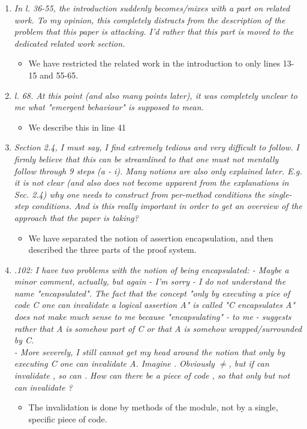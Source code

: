 \documentclass[11pt]{amsart}
\begin{document}
\begin{enumerate}
\item
\emph{In l. 36-55, the introduction suddenly becomes/mixes with a part on related work. To my opinion, this completely distracts from the description of the problem that this paper is attacking. I'd rather that this part is moved to the dedicated related work section.}

\begin{itemize}
\item We have restricted the related work in the introduction to only lines 13-15 and 55-65.
\end{itemize}
\item
\emph{l. 68. At this point (and also many points later), it was completely unclear to me what "emergent behaviour" is supposed to mean. }

\begin{itemize}
\item We describe this in line 41
\end{itemize}
\item
\emph{
Section 2.4, I must say, I find extremely tedious and very difficult to follow. I firmly believe that this can be streamlined to that one must not mentally follow through 9 steps (a - i). Many notions are also only explained later. E.g. it is not clear (and also does not become apparent from the explanations in Sec. 2.4) why one needs to construct from per-method conditions the single-step conditions. And is this really important in order to get an overview of the approach that the paper is taking?
}
\begin{itemize}
\item We have separated the notion of assertion encapsulation, and then described the three parts of the proof system.
\end{itemize}

\item
\emph{
.102: I have two problems with the notion of being encapsulated:
   - Maybe a minor comment, actually, but again - I'm sorry - I do not understand the name "encapsulated". The fact that the concept  "only by executing a pice of code C one can invalidate a logical assertion A"  is called "C encapsulates A" does not make much sense to me because "encapsulating" - to me - suggests rather that A is somehow part of C or that A is somehow wrapped/surrounded by C.
   } 
   \\
\emph{   
   - More severely, I still cannot get my head around the notion that only by executing C one can invalidate A. Imagine . Obviously $\neq$, but if  can invalidate , so can . How can there be a piece of code 
   , so that only  but not  can invalidate ?
}
\begin{itemize}
\item The invalidation is done by methods of the module, not by a single, specific piece of code.
\end{itemize}


\end{enumerate}
\end{document}
